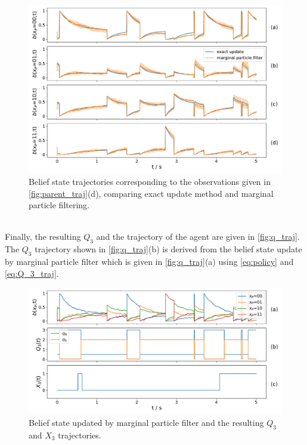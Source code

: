 \begin{figure}[t]
	\begin{center}
		\includegraphics[width=.9\textwidth]{figures/sim_example/belief_traj}
		\caption[Belief state trajectories]{Belief state trajectories corresponding to the observations given in \autoref{fig:parent_traj}(d), comparing exact update method and marginal particle filtering.}
		\label{fig:belief_traj}
	\end{center}
\end{figure}\\
Finally, the resulting $ Q_3 $ and the trajectory of the agent are given in \autoref{fig:q_traj}. The $ Q_3 $ trajectory shown in \autoref{fig:q_traj}(b) is derived from the belief state update by marginal particle filter which is given in \autoref{fig:q_traj}(a) using \autoref{eq:policy} and \autoref{eq:Q_3_traj}.
\begin{figure}[t]
	\begin{center}
		\includegraphics[width=.9\textwidth]{figures/sim_example/q_traj}
		\caption[$ Q_3 $ and $ X_3 $ trajectories]{Belief state updated by marginal particle filter and the resulting $ Q_3 $ and $ X_3 $ trajectories.}
		\label{fig:q_traj}
	\end{center}
\end{figure}\\
